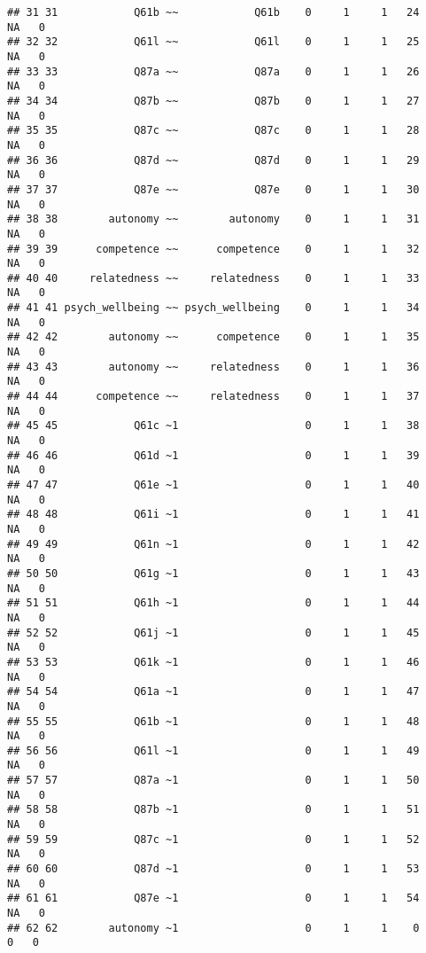 \documentclass[
]{article}
\begin{document}
\begin{verbatim}
## 31 31            Q61b ~~            Q61b    0     1     1   24     NA   0      
## 32 32            Q61l ~~            Q61l    0     1     1   25     NA   0      
## 33 33            Q87a ~~            Q87a    0     1     1   26     NA   0      
## 34 34            Q87b ~~            Q87b    0     1     1   27     NA   0      
## 35 35            Q87c ~~            Q87c    0     1     1   28     NA   0      
## 36 36            Q87d ~~            Q87d    0     1     1   29     NA   0      
## 37 37            Q87e ~~            Q87e    0     1     1   30     NA   0      
## 38 38        autonomy ~~        autonomy    0     1     1   31     NA   0      
## 39 39      competence ~~      competence    0     1     1   32     NA   0      
## 40 40     relatedness ~~     relatedness    0     1     1   33     NA   0      
## 41 41 psych_wellbeing ~~ psych_wellbeing    0     1     1   34     NA   0      
## 42 42        autonomy ~~      competence    0     1     1   35     NA   0      
## 43 43        autonomy ~~     relatedness    0     1     1   36     NA   0      
## 44 44      competence ~~     relatedness    0     1     1   37     NA   0      
## 45 45            Q61c ~1                    0     1     1   38     NA   0      
## 46 46            Q61d ~1                    0     1     1   39     NA   0      
## 47 47            Q61e ~1                    0     1     1   40     NA   0      
## 48 48            Q61i ~1                    0     1     1   41     NA   0      
## 49 49            Q61n ~1                    0     1     1   42     NA   0      
## 50 50            Q61g ~1                    0     1     1   43     NA   0      
## 51 51            Q61h ~1                    0     1     1   44     NA   0      
## 52 52            Q61j ~1                    0     1     1   45     NA   0      
## 53 53            Q61k ~1                    0     1     1   46     NA   0      
## 54 54            Q61a ~1                    0     1     1   47     NA   0      
## 55 55            Q61b ~1                    0     1     1   48     NA   0      
## 56 56            Q61l ~1                    0     1     1   49     NA   0      
## 57 57            Q87a ~1                    0     1     1   50     NA   0      
## 58 58            Q87b ~1                    0     1     1   51     NA   0      
## 59 59            Q87c ~1                    0     1     1   52     NA   0      
## 60 60            Q87d ~1                    0     1     1   53     NA   0      
## 61 61            Q87e ~1                    0     1     1   54     NA   0      
## 62 62        autonomy ~1                    0     1     1    0      0   0      

\end{verbatim}
\end{document}
